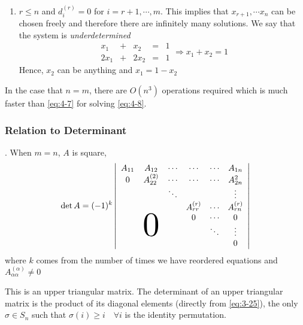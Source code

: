 \documentclass{article}
\numberwithin{equation}{section}
\begin{document}
\begin{enumerate}
    \item $r \leq n$ and $d^{(r)}_{i} = 0$ for $i = r + 1, \cdots, m$. 
    This implies that $x_{r + 1}, \cdots x_{n}$ can be chosen freely and therefore there are infinitely many solutions.
    We say that the system is \emph{underdetermined}
    \[
        \begin{array}{ccccc}
            x_1 & + & x_2 & = & 1 \\
            2x_1& + & 2x_2 & = & 1
        \end{array}
        \Rightarrow x_1 + x_2 = 1
    \]
    Hence, $x_2$ can be anything and $x_1 = 1 - x_2$
\end{enumerate}

\begin{remark}
    In the case that $n=m$, there are $O(n^3)$ operations required which is much faster than \eqref{eq:4-7} for solving \eqref{eq:4-8}.
\end{remark}

\subsubsection{Relation to Determinant}.
When $m = n$, $A$ is square,
\begin{equation}\label{eq:4-10}
    \det A = (-1)^k \abs{\begin{array}{cccccc}
        A_{11} & A_{12}                  & \cdots & \cdots       & \cdots & A_{1n} \\
        0      & A^{(2)}_{22}            & \cdots & \cdots       & \cdots & A^{2}_{2n} \\
               &                         & \ddots &              &        & \vdots      \\
               &                         &        & A^{(r)}_{rr} & \cdots & A^{(r)}_{rn} \\
               &                         &        &      0       & \cdots & 0      \\
               & \smash{\scalebox{4}{0}} &        &              & \ddots & \vdots \\
               &                         &        &              &        & 0 \\              
    \end{array}}
\end{equation}
where $k$ comes from the number of times we have reordered equations and $A^{(\alpha)}_{\alpha \alpha} \neq 0$

This is an upper triangular matrix. 
The determinant of an upper triangular matrix is the product of its diagonal elements (directly from \eqref{eq:3-25}),
the only $\sigma \in S_n$ such that $\sigma(i) \geq i \quad \forall i$ is the identity permutation.
\end{document}
